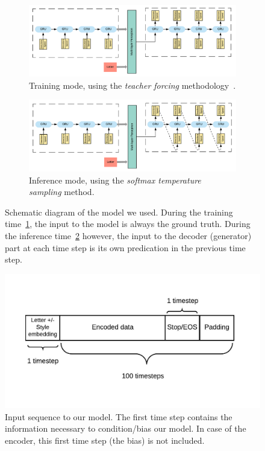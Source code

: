     \begin{figure}[htbp!]
      \centering
      \begin{subfigure}{1.0\textwidth}
        \centering
        \includegraphics[scale=0.7]{images/framework/training_mode.png}
        \caption{Training mode\label{fig:training_mode}, using the \textit{teacher forcing} methodology~\citep{Williams:1989:LAC:1351124.1351135,Goodfellow-et-al-2016}.}
      \end{subfigure}
      \begin{subfigure}{1.0\textwidth}
        \centering
        \includegraphics[scale=0.7]{images/framework/inference_mode.png}
        \caption{Inference mode\label{fig:inf_mode}, using the \textit{softmax temperature sampling} method.}
      \end{subfigure}
      \caption{Schematic diagram of the model we used. During the training time~\ref{fig:training_mode}, the input to the model is always the ground truth. During the inference time~\ref{fig:inf_mode} however, the input to the decoder (generator) part at each time step is its own predication in the previous time step.}
      \label{fig:model_arch}
    \end{figure}

    \begin{figure}[htbp!]
      \centering
      \includegraphics[scale=1.0]{images/framework/input_shape.jpeg}
      \caption{Input sequence to our model. The first time step contains the information necessary to condition/bias our model. In case of the encoder, this first time step (the bias) is not included.}
      \label{fig:input_shape}
    \end{figure}


